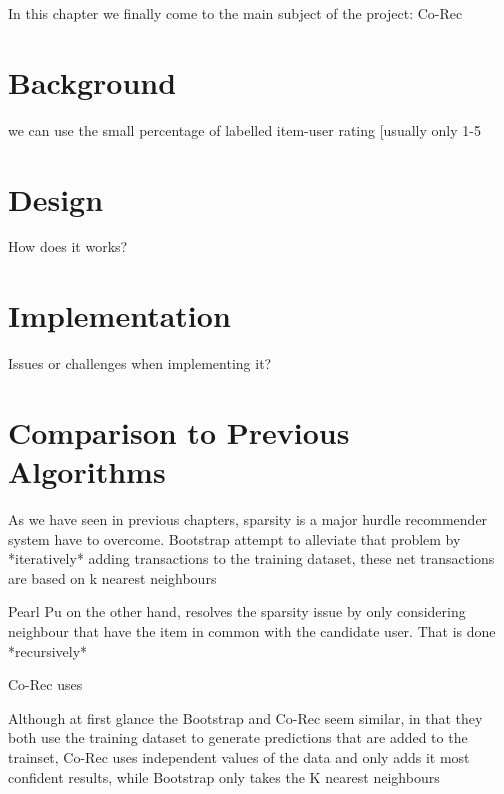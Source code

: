 In this chapter we finally come to the main subject of the project: Co-Rec

\section{Background}
we can use the small percentage of labelled item-user rating [usually only 1-5%

\section{Design}
How does it works?

\section{Implementation}
Issues or challenges when implementing it?

\section{Comparison to Previous Algorithms}
As we have seen in previous chapters, sparsity is a major hurdle recommender system have to overcome. Bootstrap attempt to alleviate that problem by *iteratively* adding transactions to the training dataset, these net transactions are based on k nearest neighbours

Pearl Pu on the other hand, resolves the sparsity issue by only considering neighbour that have the item in common with the candidate user. That is done *recursively* 


Co-Rec uses 

Although at first glance the Bootstrap and Co-Rec seem similar, in that they both use the training dataset to generate predictions that are added to the trainset, Co-Rec uses independent values of the data and only adds it most confident results, while Bootstrap only takes the K nearest neighbours